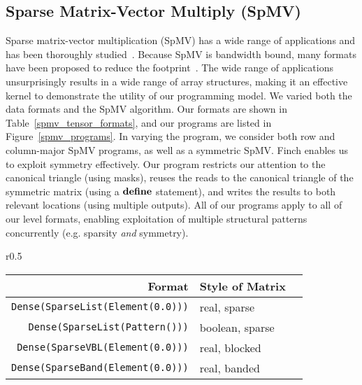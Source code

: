   \subsection{Sparse Matrix-Vector Multiply (SpMV)}
  Sparse matrix-vector multiplication (SpMV) has a wide range of applications and has been thoroughly studied~\cite{liu_csr5_2015,
  zhou_enabling_2020}. 
  Because SpMV is bandwidth bound, many formats have
  been proposed to reduce the footprint~\cite{langr_evaluation_2016}. 
  The wide range of applications unsurprisingly
  results in a wide range of array structures, making it an effective kernel to
  demonstrate the utility of our programming model. 
  We varied both the data formats and the SpMV algorithm. 
  Our formats
  are shown in Table~\ref{spmv_tensor_formats}, and our programs are listed in
  Figure~\ref{spmv_programs}.
  In varying the program, we consider both row and column-major SpMV programs, as
  well as a symmetric SpMV. 
  Finch enables us to exploit symmetry
  effectively.
  Our program restricts our attention to the canonical triangle (using
  masks), reuses the reads to the canonical triangle of the symmetric matrix
  (using a $\text{\textbf{define}}$ statement), and writes the results to both relevant
  locations (using multiple outputs).
  All of our programs apply to all of our level formats, enabling exploitation of multiple structural patterns concurrently (e.g. sparsity \textit{and} symmetry).
   
  \begin{wrapfigure}{r}{0.5\linewidth}
    \scriptsize
    \centering
    \vspace{-12pt}
    \vspace{-12pt}
    \begin{tabular}{|r|l|l|}
        \hline
        \textbf{Format} & \textbf{Style of Matrix}\\
        \hline
        \texttt{Dense(SparseList(Element(0.0)))} & real, sparse \\
        \texttt{Dense(SparseList(Pattern()))} & boolean, sparse \\
        \texttt{Dense(SparseVBL(Element(0.0)))} & real, blocked \\
        \texttt{Dense(SparseBand(Element(0.0)))} & real, banded \\
        \hline 
    \end{tabular}
    \caption{SpMV Tensor Formats}
    \label{spmv_tensor_formats}
    \vspace{-8pt}
  \end{wrapfigure} 

